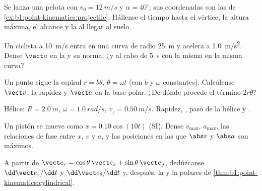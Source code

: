 \begin{exercise}[$\star$]\label{exo:b1:point-kinematics:4}
Se lanza una pelota con $v_0 = \qty{12}{m/s}$ y $\alpha = 40^\circ$; sus
coordenadas son las de \cref{ex:b1:point-kinematics:projectile}. Hállense
el tiempo hasta el vértice, la altura máxima, el alcance y la  al
llegar al suelo.
\end{exercise}

\begin{exercise}[$\star\star$]\label{exo:b1:point-kinematics:5}
Un ciclista a \qty{10}{m/s} entra en una curva de radio \qty{25}{m} y
acelera a \qty{1.0}{m/s^2}. Dense $\vect a$ en la  y su
norma; ¿y al cabo de \qty{5}{s} con la misma  en la misma curva?
\end{exercise}

\begin{exercise}[$\star\star$]\label{exo:b1:point-kinematics:6}
Un punto sigue la espiral $r = b\theta$, $\theta = \omega t$ (con $b$ y
$\omega$ constantes). Calcúlense $\vect v$, la rapidez y $\vect a$ en la
base polar. ¿De dónde procede el término $2\dot r\dot\theta$?
\end{exercise}

\begin{exercise}[$\star\star$]\label{exo:b1:point-kinematics:7}
Hélice: $R = \qty{2.0}{m}$, $\omega = \qty{1.0}{rad/s}$, $v_z = \qty{0.50}{m/s}$.
Rapidez, , paso de la hélice y .
\end{exercise}

\begin{exercise}[$\star\star$]\label{exo:b1:point-kinematics:8}
Un pistón se mueve como $x = 0.10\cos(10t)$ (SI). Dense $v_{\max}$,
$a_{\max}$, las relaciones de fase entre $x$, $v$ y $a$, y las posiciones
en las que $\abs v$ y $\abs a$ son máximos.
\end{exercise}

\begin{exercise}[$\star\star$]\label{exo:b1:point-kinematics:9}
A partir de $\vect e_r = \cos\theta\,\vect e_x + \sin\theta\,\vect e_y$,
dedúzcanse $\dd\vect e_r/\dd t$ y $\dd\vect e_\theta/\dd t$ y, después, la
 y la  polares de \cref{thm:b1:point-kinematics:cylindrical}.
\end{exercise}

